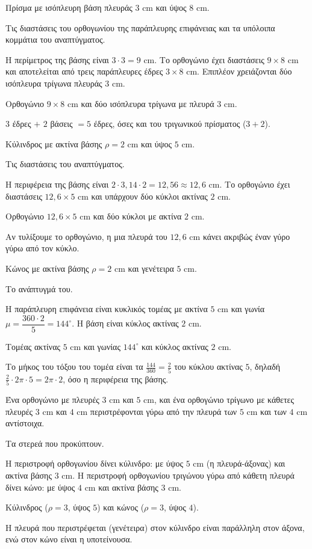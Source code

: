 \tixero Πρίσμα με ισόπλευρη βάση πλευράς $3$ cm και ύψος $8$ cm.\par
\tithelo Τις διαστάσεις του ορθογωνίου της παράπλευρης επιφάνειας και τα υπόλοιπα κομμάτια του αναπτύγματος.\par
\possindeo Η περίμετρος της βάσης είναι $3\cdot3=9$ cm. Το ορθογώνιο έχει διαστάσεις $9\times8$ cm και αποτελείται από τρεις παράπλευρες έδρες $3\times8$ cm. Επιπλέον χρειάζονται δύο ισόπλευρα τρίγωνα πλευράς $3$ cm.\par
\apantisi Ορθογώνιο $9\times8$ cm και δύο ισόπλευρα τρίγωνα με πλευρά $3$ cm.\par
\elegxos $3$ έδρες $+$ $2$ βάσεις $=5$ έδρες, όσες και του τριγωνικού πρίσματος ($3+2$).

\tixero Κύλινδρος με ακτίνα βάσης $\rho=2$ cm και ύψος $5$ cm.\par
\tithelo Τις διαστάσεις του αναπτύγματος.\par
\possindeo Η περιφέρεια της βάσης είναι $2\cdot3{,}14\cdot2=12{,}56\approx12{,}6$ cm. Το ορθογώνιο έχει διαστάσεις $12{,}6\times5$ cm και υπάρχουν δύο κύκλοι ακτίνας $2$ cm.\par
\apantisi Ορθογώνιο $12{,}6\times5$ cm και δύο κύκλοι με ακτίνα $2$ cm.\par
\elegxos Αν τυλίξουμε το ορθογώνιο, η μια πλευρά του $12{,}6$ cm κάνει ακριβώς έναν γύρο γύρω από τον κύκλο.

\tixero Κώνος με ακτίνα βάσης $\rho=2$ cm και γενέτειρα $5$ cm.\par
\tithelo Το ανάπτυγμά του.\par
\possindeo Η παράπλευρη επιφάνεια είναι κυκλικός τομέας με ακτίνα $5$ cm και γωνία $\mu=\dfrac{360\cdot2}{5}=144^\circ$. Η βάση είναι κύκλος ακτίνας $2$ cm.\par
\apantisi Τομέας ακτίνας $5$ cm και γωνίας $144^\circ$ και κύκλος ακτίνας $2$ cm.\par
\elegxos Το μήκος του τόξου του τομέα είναι τα $\frac{144}{360}=\frac{2}{5}$ του κύκλου ακτίνας $5$, δηλαδή $\frac{2}{5}\cdot2\pi\cdot5=2\pi\cdot2$, όσο η περιφέρεια της βάσης.

\tixero Ένα ορθογώνιο με πλευρές $3$ cm και $5$ cm, και ένα ορθογώνιο τρίγωνο με κάθετες πλευρές $3$ cm και $4$ cm περιστρέφονται γύρω από την πλευρά των $5$ cm και των $4$ cm αντίστοιχα.\par
\tithelo Τα στερεά που προκύπτουν.\par
\possindeo Η περιστροφή ορθογωνίου δίνει κύλινδρο: με ύψος $5$ cm (η πλευρά-άξονας) και ακτίνα βάσης $3$ cm. Η περιστροφή ορθογωνίου τριγώνου γύρω από κάθετη πλευρά δίνει κώνο: με ύψος $4$ cm και ακτίνα βάσης $3$ cm.\par
\apantisi Κύλινδρος ($\rho=3$, ύψος $5$) και κώνος ($\rho=3$, ύψος $4$).\par
\elegxos Η πλευρά που περιστρέφεται (γενέτειρα) στον κύλινδρο είναι παράλληλη στον άξονα, ενώ στον κώνο είναι η υποτείνουσα.

